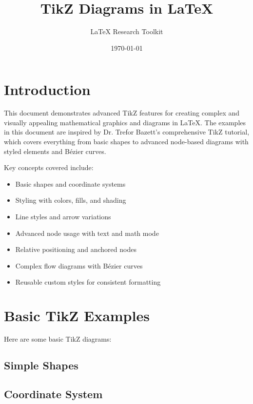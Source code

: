 \documentclass{article}
\title{TikZ Diagrams in LaTeX}
\author{LaTeX Research Toolkit}
\date{\today}
\begin{document}
\maketitle

\section*{Introduction}
This document demonstrates advanced TikZ features for creating complex and visually appealing mathematical graphics and diagrams in \LaTeX. The examples in this document are inspired by Dr. Trefor Bazett's comprehensive TikZ tutorial, which covers everything from basic shapes to advanced node-based diagrams with styled elements and B\'ezier curves.

Key concepts covered include:
\begin{itemize}
    \item Basic shapes and coordinate systems
    \item Styling with colors, fills, and shading
    \item Line styles and arrow variations
    \item Advanced node usage with text and math mode
    \item Relative positioning and anchored nodes
    \item Complex flow diagrams with B\'ezier curves
    \item Reusable custom styles for consistent formatting
\end{itemize}

\section{Basic TikZ Examples}
Here are some basic TikZ diagrams:

\subsection{Simple Shapes}

\subsection{Coordinate System}
\end{document}
